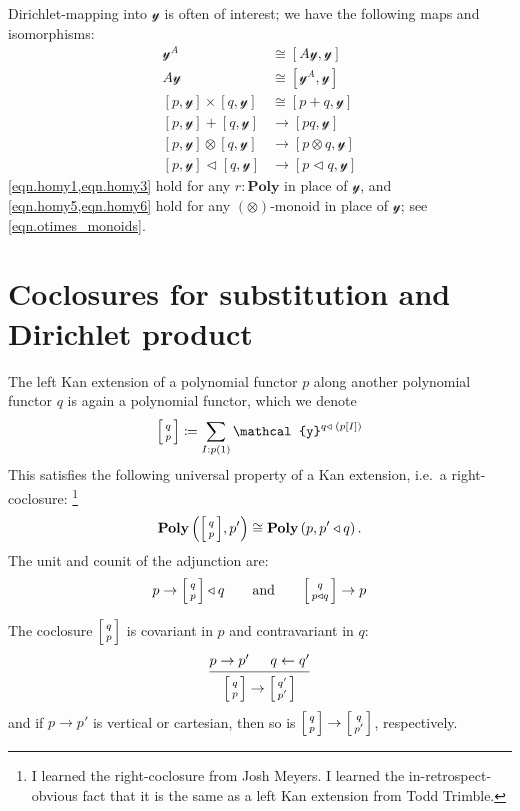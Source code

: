 \documentclass[11pt, one side, article]{memoir}
\makeatletter
\theoremstyle{definition}
\theoremstyle{plain}
\newcommand{\Cat}[1]{\mathbf{#1}}%
\newcommand{\Fun}[1]{\mathsf{#1}}%
\newcommand{\To}[2][]{\xrightarrow[#1]{\tn{$#2$}}}
\newcommand{\from}{\leftarrow}
\newcommand{\tn}[1]{\textnormal{#1}}
\newcommand{\yon}{{\mathcal{y}}}
\newcommand{\poly}{\Cat{Poly}}
\newcommand{\0}{\textsf{0}}
\newcommand{\1}{\tn{\textsf{1}}}
\newcommand{\tri}{\mathbin{\triangleleft}}
\newcommand{\indep}{\Fun{Indep}}
\newcommand{\biglens}[2]{
     \begin{bmatrix}{\vphantom{f_f^f}#2} \\ {\vphantom{f_f^f}#1} \end{bmatrix}
}
\newcommand{\littlelens}[2]{
     \begin{bsmallmatrix}{\vphantom{f}#2} \\ {\vphantom{f}#1} \end{bsmallmatrix}
}
\newcommand{\lens}[2]{
  \relax\if@display
     \biglens{#1}{#2}
  \else
     \littlelens{#1}{#2}
  \fi
}
\newcommand{\hh}[2][]{#1 \tn{#2} #1}
\newcommand{\qqand}{\hh[\qquad]{and}}
\makeatother
\begin{document}
Dirichlet-mapping into $\yon$ is often of interest; we have the following maps and isomorphisms:
\begin{align}
\label{eqn.homy2}
  \yon^A&\cong[A\yon,\yon]\\
\label{eqn.homy4}
  A\yon&\cong[\yon^A,\yon]\\
\label{eqn.homy1}
  [p,\yon]\times[q,\yon]&\cong[p+q,\yon]\\
\label{eqn.homy3}
  [p,\yon]+[q,\yon]&\to[pq,\yon]\\
\label{eqn.homy5}
	[p,\yon]\otimes[q,\yon]&\to[p\otimes q,\yon]\\
\label{eqn.homy6}
	[p,\yon]\tri[q,\yon]&\to[p\tri q,\yon]
\end{align}
\cref{eqn.homy1,eqn.homy3} hold for any $r:\poly$ in place of $\yon$, and \cref{eqn.homy5,eqn.homy6} hold for any $(\otimes)$-monoid in place of $\yon$; see \cref{eqn.otimes_monoids}.


\chapter{Coclosures for substitution and Dirichlet product}

The left Kan extension of a polynomial functor $p$ along another polynomial functor $q$ is again a polynomial functor, which we denote
\begin{equation}
\lens{p}{q}\coloneqq\sum_{I: p(1)}\yon^{q\tri\; (p[I])}
\end{equation}
This satisfies the following universal property of a Kan extension, i.e.\ a right-coclosure:%
\footnote{I learned the right-coclosure from Josh Meyers. I learned the in-retrospect-obvious fact that it is the same as a left Kan extension from Todd Trimble.}
\begin{equation}\label{eqn.cocl_define}
	\poly\left(\lens{p}{q},p'\right)\cong\poly\left(p,p'\tri q\right).
\end{equation}
The unit and counit of the adjunction are:
\begin{equation}\label{eqn.coclosure_unit_counit}
  p\to\lens{p}{q}\tri q
  \qqand
	\lens{p\tri q}{q}\to p
\end{equation}

The coclosure $\lens{p}{q}$ is covariant in $p$ and contravariant in $q$:
\begin{equation}
  \begin{prooftree}
  	\Hypo{p\to p'}
  	\Hypo{q\from q'}
    \Infer2{\lens{p}{q}\to\lens{p'}{q'}}
  \end{prooftree}
\end{equation}
and if $p\to p'$ is vertical or cartesian, then so is $\lens{p}{q}\to\lens{p'}{q}$, respectively. 
\end{document}
